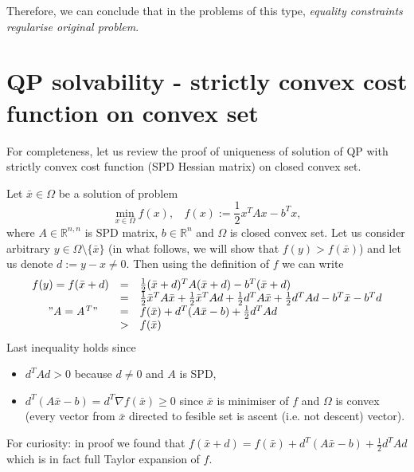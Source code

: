 \documentclass{article}
\begin{document}
Therefore, we can conclude that in the problems of this type, {\it equality constraints regularise original problem}.

\section{QP solvability - strictly convex cost function on convex set}

For completeness, let us review the proof of uniqueness of solution of QP with strictly convex cost function (SPD Hessian matrix) on closed convex set. \newline

Let $\bar{x} \in \Omega$ be a solution of problem 
\begin{displaymath}
 \min\limits_{x \in \Omega} f(x), ~~~~ f(x) := \frac{1}{2} x^T A x - b^T x,
\end{displaymath}
where $A \in \mathbb{R}^{n,n}$ is SPD matrix, $b \in \mathbb{R}^n$ and $\Omega$ is closed convex set. \newline
Let us consider arbitrary $y \in \Omega \setminus \lbrace \bar{x} \rbrace$ (in what follows, we will show that $f(y) > f(\bar{x})$)
and let us denote $d := y - x \neq 0$. Then using the definition of $f$ we can write
\begin{displaymath}
 \begin{array}{rcl}
 f(y) = f(\bar{x} + d) & = & \frac{1}{2} (\bar{x}+d)^T A (\bar{x}+d) - b^T (\bar{x} + d) \\
 & = & \frac{1}{2} \bar{x}^T A \bar{x} + \frac{1}{2} \bar{x}^T A d + \frac{1}{2} d^T A \bar{x} + \frac{1}{2} d^T A d - b^T \bar{x} - b^T d \\
 \mathit{"A = A^T"}~~~ & = & f(\bar{x}) + d^T( A \bar{x} - b) + \frac{1}{2} d^T A d \\
 & > & f(\bar{x}) 
 \end{array}
\end{displaymath}
Last inequality holds since
\begin{itemize}
 \item $d^T A d > 0$ because $d \neq 0$ and $A$ is SPD,
 \item $d^T( A \bar{x} - b) = d^T \nabla f(\bar{x}) \geq 0$ since $\bar{x}$ is minimiser of $f$ and $\Omega$ is convex (every vector from $\bar{x}$ directed to fesible set is ascent (i.e. not descent) vector).
\end{itemize}

For curiosity: in proof we found that $f(\bar{x} + d) = f(\bar{x}) + d^T( A \bar{x} - b) + \frac{1}{2} d^T A d$ which is in fact full Taylor expansion of $f$.
\end{document}
